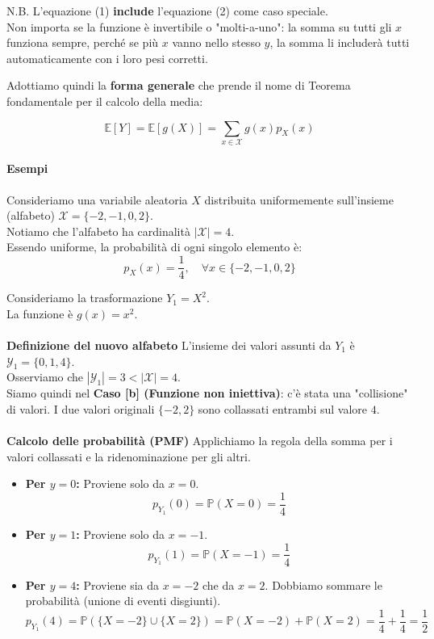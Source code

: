 N.B. L'equazione (1) \textbf{include} l'equazione (2) come caso speciale.
\\Non importa se la funzione è invertibile o "molti-a-uno": la somma su tutti gli $x$ funziona sempre, perché se più $x$ vanno nello stesso $y$, la somma li includerà tutti automaticamente con i loro pesi corretti.

Adottiamo quindi la \textbf{forma generale} che prende il nome di Teorema fondamentale per il calcolo della media:

\begin{equation}
\boxed{\mathbb{E}[Y] = \mathbb{E}[g(X)] = \sum_{x \in \mathcal{X}} g(x) p_X(x)}
\end{equation}

\paragraph{Esempi}

Consideriamo una variabile aleatoria $X$ distribuita uniformemente sull'insieme (alfabeto) $\mathcal{X} = \{-2, -1, 0, 2\}$.
\\Notiamo che l'alfabeto ha cardinalità $|\mathcal{X}| = 4$.
\\Essendo uniforme, la probabilità di ogni singolo elemento è:
\[ p_X(x) = \frac{1}{4}, \quad \forall x \in \{-2, -1, 0, 2\} \]

Consideriamo la trasformazione $Y_1 = X^2$.
\\La funzione è $g(x) = x^2$.
\\\\
\textbf{Definizione del nuovo alfabeto}
L'insieme dei valori assunti da $Y_1$ è $\mathcal{Y}_1 = \{0, 1, 4\}$.
\\Osserviamo che $|\mathcal{Y}_1| = 3 < |\mathcal{X}| = 4$.
\\Siamo quindi nel \textbf{Caso [b] (Funzione non iniettiva)}: c'è stata una "collisione" di valori. I due valori originali $\{-2, 2\}$ sono collassati entrambi sul valore $4$.
\\\\
\textbf{Calcolo delle probabilità (PMF)}
Applichiamo la regola della somma per i valori collassati e la ridenominazione per gli altri.

\begin{itemize}
    \item \textbf{Per $y=0$:} Proviene solo da $x=0$.
    \[ p_{Y_1}(0) = \mathbb{P}(X=0) = \frac{1}{4} \]
    
    \item \textbf{Per $y=1$:} Proviene solo da $x=-1$.
    \[ p_{Y_1}(1) = \mathbb{P}(X=-1) = \frac{1}{4} \]
    
    \item \textbf{Per $y=4$:} Proviene sia da $x=-2$ che da $x=2$. Dobbiamo sommare le probabilità (unione di eventi disgiunti).
    \[ p_{Y_1}(4) = \mathbb{P}(\{X=-2\} \cup \{X=2\}) = \mathbb{P}(X=-2) + \mathbb{P}(X=2) = \frac{1}{4} + \frac{1}{4} = \frac{1}{2} \]
\end{itemize}

